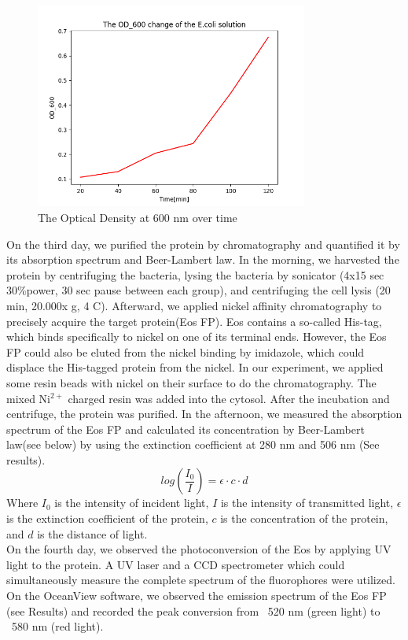 \documentclass[a4paper,english,12pt,bibliography=totoc]{scrreprt}
\begin{document}
\begin{figure}[H]
    \centering
    \includegraphics[width = 0.8\textwidth]{Figures/OD_600.png}
    \caption{The Optical Density at 600 nm over time}
    \label{fig:enter-label}
\end{figure}

On the third day, we purified the protein by chromatography and quantified it by its absorption spectrum and Beer-Lambert law. In the morning, we harvested the protein by centrifuging the bacteria, lysing the bacteria by sonicator (4x15 sec 30\%power, 30 sec pause between each group), and centrifuging the cell lysis (20 min, 20.000x g, 4 \textdegree C). Afterward, we applied nickel affinity chromatography to precisely acquire the target protein(Eos FP). Eos contains a so-called His-tag, which binds specifically to nickel on one of its terminal ends. However, the Eos FP could also be eluted from the nickel binding by imidazole, which could displace the His-tagged protein from the nickel. In our experiment, we applied some resin beads with nickel on their surface to do the chromatography. The mixed $\mathrm{Ni^{2+}}$ charged resin was added into the cytosol. After the incubation and centrifuge, the 
protein was purified. In the afternoon, we measured the absorption spectrum of the Eos FP and calculated its concentration by Beer-Lambert law(see below) by using the extinction coefficient at 280 nm and 506 nm (See results).
\[
log(\frac{I_0}{I}) = \epsilon \cdot c \cdot d
\]
Where $I_0$ is the intensity of incident light, $I$ is the intensity of transmitted light, $\epsilon$ is the extinction coefficient of the protein, $c$ is the concentration of the protein, and $d$ is the distance of light.\\

On the fourth day, we observed the photoconversion of the Eos by applying UV light to the protein. A UV laser and a CCD spectrometer which could simultaneously measure the complete spectrum of the fluorophores were utilized. On the OceanView software, we observed the emission spectrum of the Eos FP (see Results) and recorded the peak conversion from ~520 nm (green light) to ~580 nm (red light). 
\end{document}
